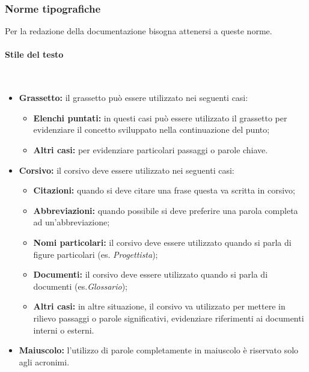 	\subsubsection{Norme tipografiche} Per la redazione della documentazione bisogna attenersi a queste norme.
		
		\paragraph{Stile del testo} \mbox{} \\
		\begin{itemize}
		\item \textbf{Grassetto:} il grassetto può essere utilizzato nei seguenti casi:
			\begin{itemize}
			\item \textbf{Elenchi puntati:} in questi casi può essere utilizzato il grassetto per evidenziare il concetto sviluppato nella continuazione del punto;
			\item \textbf{Altri casi:} per evidenziare particolari passaggi o parole chiave.
			\end{itemize}
		
		\item \textbf{Corsivo:} il corsivo deve essere utilizzato nei seguenti casi:
			\begin{itemize}
				\item \textbf{Citazioni:} quando si deve citare una frase questa va scritta in corsivo;
				\item \textbf{Abbreviazioni:} quando possibile si deve preferire una parola completa ad un’abbreviazione;
				\item \textbf{Nomi particolari:} il corsivo deve essere utilizzato quando si parla di figure particolari (es. \textit{Progettista});
				\item \textbf{Documenti:} il corsivo deve essere utilizzato quando si parla di documenti (es.\textit{Glossario});
				\item \textbf{Altri casi:} in altre situazione, il corsivo va utilizzato per mettere in rilievo passaggi o parole significativi, evidenziare riferimenti ai documenti interni o esterni.
			\end{itemize}
		
		\item \textbf{Maiuscolo:} l’utilizzo di parole completamente in maiuscolo è riservato solo agli acronimi.
		
		\end{itemize}
		
